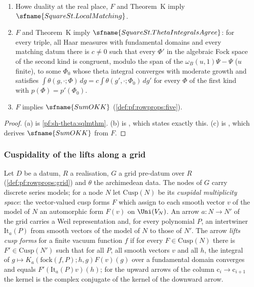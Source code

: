 \begin{corollary}\label{pf:sh-theta:sqcor}
\begin{enumerate}[label=(\alph*)]
\item Howe duality at the real place, $F$ and Theorem~K imply $\sfname{SquareSt.LocalMatching}$.
\item $F$ and Theorem~K imply $\sfname{SquareSt.ThetaIntegralsAgree}$: for every triple, all Haar measures with fundamental
domains and every matching datum there is $c\ne0$ such that every $\Phi'$ in the algebraic Fock space of the second kind is
congruent, modulo the span of the $\omega_B(u,1)\Psi-\Psi$ ($u$ finite), to some $\Phi_0$ whose theta integral converges with
moderate growth and satisfies $\int\theta(g,\cdot;\Phi)\,dg=c\int\theta(g',\cdot;\Phi_0)\,dg'$ for every $\Phi$ of the first kind with
$p(\Phi)=p'(\Phi_0)$.
\item $F$ implies $\sfname{SumOKK}$ (\cref{def:pf:rowprops:five}).
\end{enumerate}
\end{corollary}

\begin{proof}
(a) is \cref{pf:sh-theta:sqlmthm}. (b) is , which states exactly
this. (c) is , which derives $\sfname{SumOKK}$ from $F$.
\end{proof}

\subsubsection{Cuspidality of the lifts along a grid}

Let $D$ be a datum, $R$ a realisation, $G$ a grid pre-datum over $R$ (\cref{def:pf:rowprops:grid}) and $\theta$ the archimedean
data. The nodes of $G$ carry discrete series models; for a node $N$ let $\mathrm{Cusp}(N)$ be its \emph{cuspidal multiplicity
space}: the vector-valued cusp forms $F$ which assign to each smooth vector $v$ of the model of $N$ an automorphic form $F(v)$ on
$\Uni(V_N)$. An arrow $a:N\to N'$ of the grid carries a Weil representation and, for every polynomial $P$, an intertwiner
$\mathrm{It}_a(P)$ from smooth vectors of the model of $N$ to those of $N'$. The arrow \emph{lifts cusp forms} for a finite vacuum
function $f$ if for every $F\in\mathrm{Cusp}(N)$ there is $F'\in\mathrm{Cusp}(N')$ such that for all $P$, all smooth vectors $v$ and all
$h$, the integral of $g\mapsto K_a(\mathrm{fock}(f,P);h,g)F(v)(g)$ over a fundamental domain converges and equals
$F'(\mathrm{It}_a(P)v)(h)$; for the upward arrows of the column $\mathrm c_i\to\mathrm c_{i+1}$ the kernel is the complex
conjugate of the kernel of the downward arrow.

